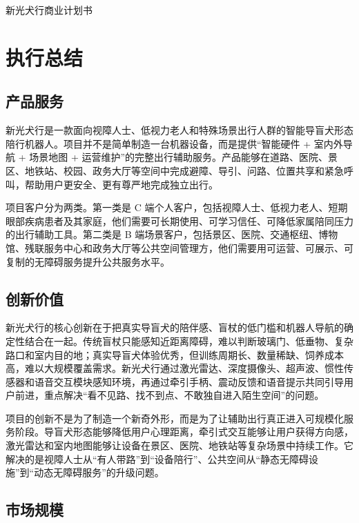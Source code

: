 \documentclass[a4paper,fontset=none]{ctexart}
\newcommand{\SongBold}{\CJKfontspec[FakeBold=2.5]{Songti SC}}
\newcommand{\ReportTitle}[1]{%
  \begin{center}
    \SongBold\fontsize{18bp}{22bp}\selectfont #1
  \end{center}
}
\begin{document}

\ReportTitle{新光犬行商业计划书}


\section{执行总结}

\subsection{产品服务}

新光犬行是一款面向视障人士、低视力老人和特殊场景出行人群的智能导盲犬形态陪行机器人。项目并不是简单制造一台机器设备，而是提供“智能硬件 + 室内外导航 + 场景地图 + 运营维护”的完整出行辅助服务。产品能够在道路、医院、景区、地铁站、校园、政务大厅等空间中完成避障、导引、问路、位置共享和紧急呼叫，帮助用户更安全、更有尊严地完成独立出行。

项目客户分为两类。第一类是 C 端个人客户，包括视障人士、低视力老人、短期眼部疾病患者及其家庭，他们需要可长期使用、可学习信任、可降低家属陪同压力的出行辅助工具。第二类是 B 端场景客户，包括景区、医院、交通枢纽、博物馆、残联服务中心和政务大厅等公共空间管理方，他们需要用可运营、可展示、可复制的无障碍服务提升公共服务水平。

\subsection{创新价值}

新光犬行的核心创新在于把真实导盲犬的陪伴感、盲杖的低门槛和机器人导航的确定性结合在一起。传统盲杖只能感知近距离障碍，难以判断玻璃门、低垂物、复杂路口和室内目的地；真实导盲犬体验优秀，但训练周期长、数量稀缺、饲养成本高，难以大规模覆盖需求。新光犬行通过激光雷达、深度摄像头、超声波、惯性传感器和语音交互模块感知环境，再通过牵引手柄、震动反馈和语音提示共同引导用户前进，重点解决“看不见路、找不到点、不敢独自进入陌生空间”的问题。

项目的创新不是为了制造一个新奇外形，而是为了让辅助出行真正进入可规模化服务阶段。导盲犬形态能够降低用户心理距离，牵引式交互能够让用户获得方向感，激光雷达和室内地图能够让设备在景区、医院、地铁站等复杂场景中持续工作。它解决的是视障人士从“有人带路”到“设备陪行”、公共空间从“静态无障碍设施”到“动态无障碍服务”的升级问题。

\subsection{市场规模}
\end{document}
